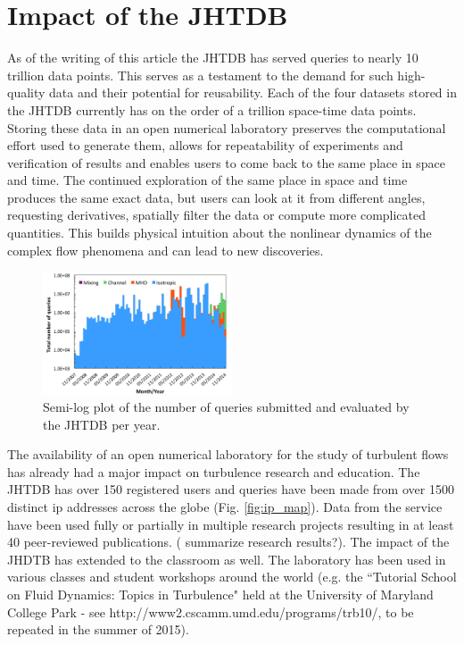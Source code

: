 \documentclass[10pt,twocolumn]{article}
\begin{document}
\section{Impact of the JHTDB}

As of the writing of this article the JHTDB has served queries to nearly 10 trillion data points. This serves as a testament to the demand for such high-quality
data and their potential for reusability. Each of the four datasets stored in the JHTDB currently has on the order of a trillion space-time data points. Storing
these data in an open numerical laboratory preserves the computational effort used to generate them, allows for repeatability of experiments and verification of
results and enables users to come back to the same place in space and time. The continued exploration of the same place in space and time produces
the same exact data, but users can look at it from different angles, requesting derivatives, spatially filter the data or compute more complicated quantities. 
This builds physical intuition about the nonlinear dynamics of the complex flow phenomena and can lead to new discoveries. 

\begin{figure}
\includegraphics[width=0.5\textwidth]{jhtdb_queries.pdf}
\caption{Semi-log plot of the number of queries submitted and evaluated by the JHTDB per year.}
\label{fig:queries}
\end{figure}

The availability of an open numerical laboratory for the study of turbulent flows has already had a major impact on turbulence research and education. 
The JHTDB has over 150 registered users and queries have been made from over 1500 distinct ip addresses across the globe (Fig. \ref{fig:ip_map}).
Data from the service have been used fully or partially in multiple research projects resulting in at least 40 peer-reviewed publications. ({\color{red} summarize
research results?}). The impact of the JHDTB has extended to the classroom as well. The laboratory has been used in various classes and student workshops 
around the world (e.g. the ``Tutorial School on Fluid Dynamics: Topics in Turbulence" held at the University of Maryland College Park - 
see http://www2.cscamm.umd.edu/programs/trb10/, to be repeated in the summer of 2015).
\end{document}
